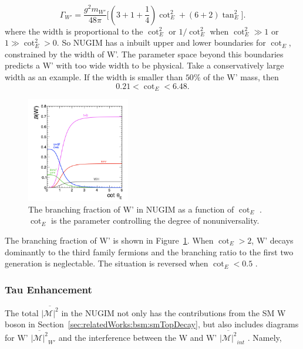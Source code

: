 \begin{equation}
	\Gamma_{W'} = \frac{g^2 m_{W'}}{48 \pi} \big [ (3+1+\frac{1}{4}) \cot^2_E + (6+2)\tan_E^2 \big] .
\end{equation}
\noindent where the width is proportional to the $ \cot^2_E $ or $ 1/\cot^2_E$ when $\cot^2_E \gg 1$ or $1 \gg \cot^2_E > 0$.  So NUGIM has a inbuilt upper and lower boundaries for $\cot_E$, constrained by the width of W'. The parameter space beyond this boundaries predicts a W' with too wide width to be physical.  Take a conservatively large width as an example. If the width is smaller than $50\%$ of the W' mass, then 
\begin{equation}
    0.21 < \cot_E < 6.48.
\end{equation}


\begin{figure}[ht]
    \centering
    \includegraphics[width=0.4\textwidth]{chapters/RelatedWorks/sectionBSM/figures/WPDecayBr.png}
    \caption{The branching fraction of W' in NUGIM as a function of $\cot_E$ \cite{Sirunyan:2018lbg}. $\cot_E$ is the parameter controlling the degree of nonuniversality.}
    \label{fig:relatedWorks:bsm:WPrime:braching}
\end{figure}



\noindent The branching fraction of W' is shown in Figure~\ref{fig:relatedWorks:bsm:WPrime:braching}. When $\cot_E > 2$, W' decays dominantly to the third family fermions and the branching ratio to the first two generation is neglectable. The situation is reversed when $\cot_E<0.5$ .


\subsubsection{Tau Enhancement}

The total $ \overline{ |\mathcal{M}|^2 }  $ in the NUGIM not only has the contributions from the SM W boson in Section~\ref{sec:relatedWorks:bsm:smTopDecay}, but also includes diagrams for W' $\overline{ |\mathcal{M}|^2 } _{W'} $  and the interference between the W and W' $\overline{ |\mathcal{M}|^2 } _{int} $ . Namely,

